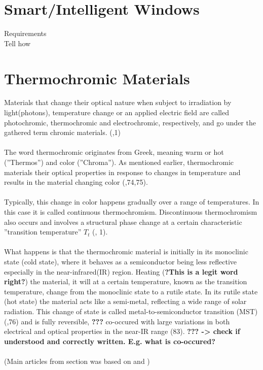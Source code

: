\section{Smart/Intelligent Windows}
Requirements\\
Tell how 

\section{Thermochromic Materials}
Materials that change their optical nature when subject to irradiation by light(photons),
temperature change or an applied electric field are called photochromic, thermochromic and 
electrochromic, respectively, and go under the gathered term chromic materials.
(\cite{Kiri2010},1)
\\
\\
The word thermochromic originates from Greek, meaning warm or hot (''Thermos'') and color (''Chroma'').
As mentioned earlier, thermochromic materials their optical properties in response to changes in
temperature and results in the material changing color (\cite{Kamalisarvestani},74,75). 
\\
\\
Typically, this change in color happens gradually over a range of temperatures. In this case it is called
continuous thermochromism. Discontinuous thermochromism also occurs and involves a structural
phase change at a certain characteristic ''transition temperature'' $T_t$ (\cite{Kiri2010}, 1). 
\\
\\
What happens is that the thermochromic material is initially in its monoclinic state (cold state), 
where it behaves as a semiconductor being less reflective especially in the near-infrared(IR) region. 
Heating (\textbf{?This is a legit word right?}) the material, it will
at a certain temperature, known as the transition temperature, change from the monoclinic state to a 
rutile state. In its rutile state (hot state) the material acts like a semi-metal, reflecting 
a wide range of solar radiation. This change of state is called metal-to-semiconductor
transition (MST) (\cite{Kamalisarvestani},76) and is fully reversible, 
\textbf{???} co-occured with large variations in 
both electrical and optical properties in the near-IR range (83). \textbf{??? -> check if understood and 
correctly written. E.g. what is co-occured?} \\
\\
(Main articles from section was based on \cite{Kamalisarvestani2013} and \cite{Kiri2010})\\




